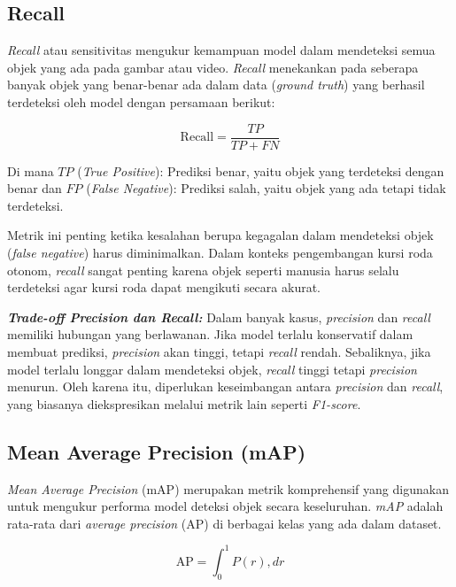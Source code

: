 \subsection{Recall}
\label{subsec:recall}

\emph{Recall} atau sensitivitas mengukur kemampuan model dalam mendeteksi semua objek yang ada pada gambar atau video. \emph{Recall} menekankan pada seberapa banyak objek yang benar-benar ada dalam data (\emph{ground truth}) yang berhasil terdeteksi oleh model dengan persamaan berikut:

\begin{equation} 
  \mathrm{Recall} = \frac{TP}{TP + FN} 
\end{equation}

Di mana \(TP\) (\emph{True Positive}): Prediksi benar, yaitu objek yang terdeteksi dengan benar dan \(FP\) (\emph{False Negative}): Prediksi salah, yaitu objek yang ada tetapi tidak terdeteksi.

Metrik ini penting ketika kesalahan berupa kegagalan dalam mendeteksi objek (\emph{false negative}) harus diminimalkan. Dalam konteks pengembangan kursi roda otonom, \emph{recall} sangat penting karena objek seperti manusia harus selalu terdeteksi agar kursi roda dapat mengikuti secara akurat.

\textbf{\emph{Trade-off Precision dan Recall:}} Dalam banyak kasus, \emph{precision} dan \emph{recall} memiliki hubungan yang berlawanan. Jika model terlalu konservatif dalam membuat prediksi, \emph{precision} akan tinggi, tetapi \emph{recall} rendah. Sebaliknya, jika model terlalu longgar dalam mendeteksi objek, \emph{recall} tinggi tetapi \emph{precision} menurun. Oleh karena itu, diperlukan keseimbangan antara \emph{precision} dan \emph{recall}, yang biasanya diekspresikan melalui metrik lain seperti \emph{F1-score}.

\subsection{Mean Average Precision (mAP)}
\label{subsec:mAP}

\emph{Mean Average Precision} (mAP) merupakan metrik komprehensif yang digunakan untuk mengukur performa model deteksi objek secara keseluruhan. \emph{mAP} adalah rata-rata dari \emph{average precision} (AP) di berbagai kelas yang ada dalam dataset.

\begin{equation} 
  \mathrm{AP} = \int_0^1 P(r) , dr 
\end{equation}


